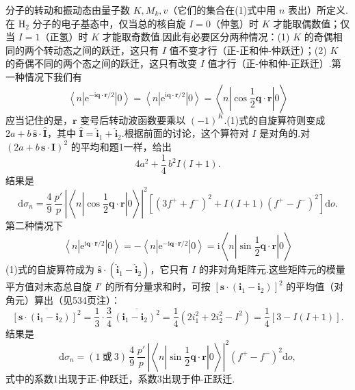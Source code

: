 \begin{xiti}
分子的转动和振动态由量子数 $K,M_k,v$（它们的集合在(1)式中用 $n$ 表出）所定义.在 $\mathrm{H}_2$ 分子的电子基态中，仅当总的核自旋 $I=0$（仲氢）时 $K$ 才能取偶数值；仅当 $I=1$（正氢）时 $K$ 才能取奇数值.因此有必要区分两种情况：(1) $K$ 的奇偶相同的两个转动态之间的跃迁，这只有 $I$ 值不变才行（正-正和仲-仲跃迁）；(2) $K$ 的奇偶不同的两个态之间的跃迁，这只有改变 $I$ 值才行（正-仲和仲-正跃迁）.第一种情况下我们有
\begin{equation*}
  \left\langle n\left|\mathrm{e}^{-\mathrm{i}\boldsymbol{q}\cdot\boldsymbol{r}/2}\right|0\right\rangle
  =\left\langle n\left|\mathrm{e}^{\mathrm{i}\boldsymbol{q}\cdot\boldsymbol{r}/2}\right|0\right\rangle
  =\left\langle n\left|\cos\frac{1}{2}\boldsymbol{q}\cdot\boldsymbol{r}\right|0\right\rangle
\end{equation*}
应当记住的是，$\boldsymbol{r}$ 变号后转动波函数要乘以 $(-1)^K$.(1)式的自旋算符则变成
$2a+b\,\hat{\boldsymbol{s}}\cdot\hat{\boldsymbol{I}}$，其中
$\hat{\boldsymbol{I}}=\hat{\boldsymbol{i}}_1+\hat{\boldsymbol{i}}_2$.根据前面的讨论，这个算符对 $I$ 是对角的.对 $(2a+b\,\boldsymbol{s}\cdot\boldsymbol{I})^2$ 的平均和题1一样，给出
\begin{equation*}
  4a^2+\frac{1}{4}\,b^2I(I+1).
\end{equation*}
结果是
\begin{equation}
  \mathrm{d}\sigma_n=\frac{4}{9}\,\frac{p'}{p}\,
  \left|\left\langle n\left|\cos\frac{1}{2}\boldsymbol{q}\cdot\boldsymbol{r}\right|0\right\rangle\right|^2
  \left[\left(3f^{+}+f^{-}\right)^2+I(I+1)\left(f^{+}-f^{-}\right)^2\right]\mathrm{d}o.
\end{equation}
第二种情况下
\begin{equation*}
  \left\langle n\left|\mathrm{e}^{\mathrm{i}\boldsymbol{q}\cdot\boldsymbol{r}/2}\right|0\right\rangle
  =-\left\langle n\left|\mathrm{e}^{-\mathrm{i}\boldsymbol{q}\cdot\boldsymbol{r}/2}\right|0\right\rangle
  =\mathrm{i}\left\langle n\left|\sin\frac{1}{2}\boldsymbol{q}\cdot\boldsymbol{r}\right|0\right\rangle
\end{equation*}
(1)式的自旋算符成为 $\hat{\boldsymbol{s}}\cdot(\hat{\boldsymbol{i}}_1-\hat{\boldsymbol{i}}_2)$，它只有 $I$ 的非对角矩阵元.这些矩阵元的模量平方值对末态总自旋 $I'$ 的所有分量求和时，可按
$[\boldsymbol{s}\cdot(\boldsymbol{i}_1-\boldsymbol{i}_2)]^2$ 的平均值（对角元）算出（见534页注{}）：
\begin{equation*}
  \overline{\left[\boldsymbol{s}\cdot(\boldsymbol{i}_1-\boldsymbol{i}_2)\right]^2}
  =\frac{1}{3}\cdot\frac{3}{4}\,
  \overline{(\boldsymbol{i}_1-\boldsymbol{i}_2)^2}
  =\frac{1}{4}\left(2i_1^2+2i_2^2-I^2\right)
  =\frac{1}{4}\left[3-I(I+1)\right].
\end{equation*}
结果是
\begin{equation}
  \mathrm{d}\sigma_n=(1\ \text{或}\ 3)\,\frac{4}{9}\,\frac{p'}{p}\,
  \left|\left\langle n\left|\sin\frac{1}{2}\boldsymbol{q}\cdot\boldsymbol{r}\right|0\right\rangle\right|^2
  \left(f^{+}-f^{-}\right)^2\mathrm{d}o,
\end{equation}
式中的系数1出现于正-仲跃迁，系数3出现于仲-正跃迁.


\end{xiti}
